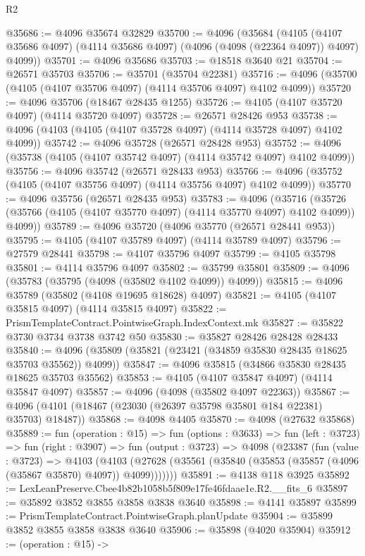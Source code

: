 \begin{lexlean}{R2}
\begin{coremodule}
@35686 := @4096 @35674 @32829
@35700 := @4096
    (@35684
      (@4105 (@4107 @35686 @4097) (@4114 @35686 @4097) (@4096 (@4098 (@22364 @4097)) @4097) @4099))
@35701 := @4096 @35686
@35703 := @18518 @3640 @21
@35704 := @26571 @35703
@35706 := @35701 (@35704 @22381)
@35716 := @4096 (@35700 (@4105 (@4107 @35706 @4097) (@4114 @35706 @4097) @4102 @4099))
@35720 := @4096 @35706 (@18467 @28435 @1255)
@35726 := @4105 (@4107 @35720 @4097) (@4114 @35720 @4097)
@35728 := @26571 @28426 @953
@35738 := @4096 (@4103 (@4105 (@4107 @35728 @4097) (@4114 @35728 @4097) @4102 @4099))
@35742 := @4096 @35728 (@26571 @28428 @953)
@35752 := @4096 (@35738 (@4105 (@4107 @35742 @4097) (@4114 @35742 @4097) @4102 @4099))
@35756 := @4096 @35742 (@26571 @28433 @953)
@35766 := @4096 (@35752 (@4105 (@4107 @35756 @4097) (@4114 @35756 @4097) @4102 @4099))
@35770 := @4096 @35756 (@26571 @28435 @953)
@35783 := @4096
    (@35716 (@35726 (@35766 (@4105 (@4107 @35770 @4097) (@4114 @35770 @4097) @4102 @4099)) @4099))
@35789 := @4096 @35720 (@4096 @35770 (@26571 @28441 @953))
@35795 := @4105 (@4107 @35789 @4097) (@4114 @35789 @4097)
@35796 := @27579 @28441
@35798 := @4107 @35796 @4097
@35799 := @4105 @35798
@35801 := @4114 @35796 @4097
@35802 := @35799 @35801
@35809 := @4096 (@35783 (@35795 (@4098 (@35802 @4102 @4099)) @4099))
@35815 := @4096 @35789 (@35802 (@4108 @19695 @18628) @4097)
@35821 := @4105 (@4107 @35815 @4097) (@4114 @35815 @4097)
@35822 := PrismTemplateContract.PointwiseGraph.IndexContext.mk
@35827 := @35822 @3730 @3734 @3738 @3742 @50
@35830 := @35827 @28426 @28428 @28433
@35840 := @4096 (@35809 (@35821 (@23421 (@34859 @35830 @28435 @18625 @35703 @35562)) @4099))
@35847 := @4096 @35815 (@34866 @35830 @28435 @18625 @35703 @35562)
@35853 := @4105 (@4107 @35847 @4097) (@4114 @35847 @4097)
@35857 := @4096 (@4098 (@35802 @4097 @22363))
@35867 := @4096 (@4101 (@18467 (@23030 (@26397 @35798 @35801 @184 @22381) @35703) @18487))
@35868 := @4098 @4405
@35870 := @4098 (@27632 @35868)
@35889 := fun (operation : @15) =>
  fun (options : @3633) =>
  fun (left : @3723) =>
  fun (right : @3907) =>
  fun (output : @3723) =>
  @4098
    (@23387
      (fun (value : @3723) =>
      @4103
        (@4103 (@27628 (@35561 (@35840 (@35853 (@35857 (@4096 (@35867 @35870) @4097)) @4099)))))))
@35891 := @4138 @118 @3925
@35892 := LexLeanPreserve.Cbee4b82b1058b5f809e17fe46fdaae1e.R2.__fits_6
@35897 := @35892 @3852 @3855 @3858 @3838 @3640
@35898 := @4141 @35897
@35899 := PrismTemplateContract.PointwiseGraph.planUpdate
@35904 := @35899 @3852 @3855 @3858 @3838 @3640
@35906 := @35898 (@4020 @35904)
@35912 := (operation : @15) ->

\end{coremodule}
\end{lexlean}
